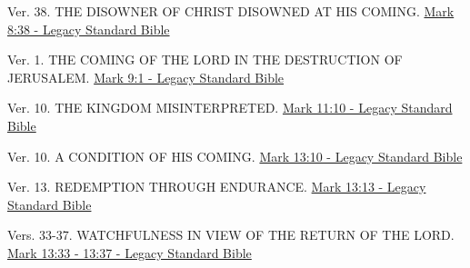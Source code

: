 \documentclass[
  ignorenonframetext,
]{beamer}
\begin{document}
\begin{frame}{8}
\label{section-161}
\begin{block}{Ver. 38. THE DISOWNER OF CHRIST DISOWNED AT HIS COMING.}
\label{ver.-38.-the-disowner-of-christ-disowned-at-his-coming.}
\href{https://read.lsbible.org/?q=mk8\%3A38}{Mark 8:38 - Legacy Standard
Bible}
\end{block}
\end{frame}

\begin{frame}{9}
\label{section-162}
\begin{block}{Ver. 1. THE COMING OF THE LORD IN THE DESTRUCTION OF
JERUSALEM.}
\label{ver.-1.-the-coming-of-the-lord-in-the-destruction-of-jerusalem.}
\href{https://read.lsbible.org/?q=mk9\%3A1}{Mark 9:1 - Legacy Standard
Bible}
\end{block}
\end{frame}

\begin{frame}{11}
\label{section-163}
\begin{block}{Ver. 10. THE KINGDOM MISINTERPRETED.}
\label{ver.-10.-the-kingdom-misinterpreted.}
\href{https://read.lsbible.org/?q=mk11\%3A10}{Mark 11:10 - Legacy
Standard Bible}
\end{block}
\end{frame}

\begin{frame}{13}
\label{section-164}
\begin{block}{Ver. 10. A CONDITION OF HIS COMING.}
\label{ver.-10.-a-condition-of-his-coming.}
\href{https://read.lsbible.org/?q=mk13\%3A10}{Mark 13:10 - Legacy
Standard Bible}
\end{block}

\begin{block}{Ver. 13. REDEMPTION THROUGH ENDURANCE.}
\label{ver.-13.-redemption-through-endurance.}
\href{https://read.lsbible.org/?q=mk13\%3A13}{Mark 13:13 - Legacy
Standard Bible}
\end{block}

\begin{block}{Vers. 33-37. WATCHFULNESS IN VIEW OF THE RETURN OF THE
LORD.}
\label{vers.-33-37.-watchfulness-in-view-of-the-return-of-the-lord.}
\href{https://read.lsbible.org/?q=mk13\%3A33-37}{Mark 13:33 - 13:37 -
Legacy Standard Bible}
\end{block}
\end{frame}
\end{document}
